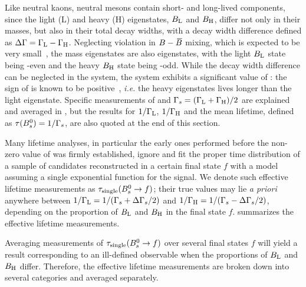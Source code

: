 %
%
%


Like neutral kaons, neutral \B mesons contain
short- and long-lived components, since the
light (L) and heavy (H)
eigenstates, $B_{\rm L}$ and $B_{\rm H}$, differ not only
in their masses, but also in their total decay widths,  
with a decay width difference defined as 
$\Delta\Gamma = \Gamma_{\rm L} - \Gamma_{\rm H}$. 
Neglecting \CP violation in $B-\kern 0.18em\overline{\kern -0.18em B}{}$ mixing, 
which is expected to be very small~\cite{Lenz:2011ti,*Lenz:2006hd,Beneke:1998sy},
the mass eigenstates are also \CP eigenstates,
with the light $B_{\rm L}$ state being \CP-even 
and the heavy $B_{\rm H}$ state being \CP-odd. 
While the decay width difference \DGd can be neglected in the \Bd system, 
the \Bs system exhibits a significant
value of \DGs: the sign of \DGs is known 
to be positive~\cite{Aaij:2012eq}, {\em i.e.}
the heavy eigenstates lives longer than the light eigenstate. 
Specific measurements of \DGs and 
$\Gamma_{s} = (\Gamma_{\rm L} + \Gamma_{\rm H})/2$ are explained
and averaged in , but the results for
$1/\Gamma_{\rm L}$, $1/\Gamma_{\rm H}$ and
the mean \Bs lifetime, defined as $\tau(B^0_s) = 1/\Gamma_{s}$,
are also quoted at the end of this section. 

Many \Bs lifetime analyses, in particular the early 
ones performed before the non-zero value of \DGs was 
firmly established, ignore \DGs and fit the proper time 
distribution of a sample of \Bs candidates 
reconstructed in a certain final state $f$
with a model assuming a single exponential function 
for the signal. We denote such {\rm effective lifetime}
measurements as $\tau_{\rm single}(B^0_s\to f)$; 
their true values may lie {\em a priori} anywhere
between $1/\Gamma_{\rm L} = 1/(\Gamma_{s}+\Delta\Gamma_{s}/2)$ and
$1/\Gamma_{\rm H}= 1/(\Gamma_{s}-\Delta\Gamma_{s}/2)$, 
depending on the proportion of $B_{\rm L}$ and $B_{\rm H}$
in the final state $f$. 
summarizes the effective 
lifetime measurements.

Averaging measurements of $\tau_{\rm single}(B^0_s\to f)$
over several final states $f$ will yield a result 
corresponding to an ill-defined observable
when the proportions of $B_{\rm L}$ and $B_{\rm H}$ differ. 
Therefore,
the effective \Bs lifetime measurements are broken down into
several categories and averaged separately.

